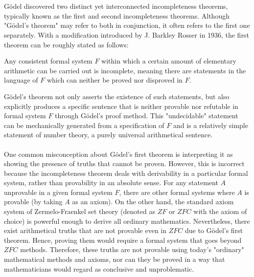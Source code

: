 \documentclass[10pt,a4paper]{article}
\newcounter{theo}
\begin{document}
                            \\
                            \\
                            Gödel discovered two distinct yet interconnected incompleteness theorems, typically known as the first and second incompleteness theorems. Although "Gödel's theorem" may refer to both in conjunction, it often refers to the first one separately. With a modification introduced by J. Barkley Rosser in 1936, the first theorem can be roughly stated as follows:
                            \begin{qt}
                                Any consistent formal system $F$ within which a certain amount of elementary arithmetic can be carried out is incomplete, meaning there are statements in the language of $F$ which can neither be proved nor disproved in $F$.
                            \end{qt}
                            Gödel's theorem not only asserts the existence of such statements, but also explicitly produces a specific sentence that is neither provable nor refutable in formal system $F$ through Gödel's proof method. This "undecidable" statement can be mechanically generated from a specification of $F$ and is a relatively simple statement of number theory, a purely universal arithmetical sentence.
                            \\
                            \\
                            One common misconception about Gödel's first theorem is interpreting it as showing the presence of truths that cannot be proven. However, this is incorrect because the incompleteness theorem deals with derivability in a particular formal system, rather than provability in an absolute sense. For any statement $A$ unprovable in a given formal system $F$, there are other formal systems where $A$ is provable (by taking $A$ as an axiom). On the other hand, the standard axiom system of Zermelo-Fraenkel set theory (denoted as $ZF$ or $ZFC$ with the axiom of choice) is powerful enough to derive all ordinary mathematics. Nevertheless, there exist arithmetical truths that are not provable even in $ZFC$ due to Gödel's first theorem. Hence, proving them would require a formal system that goes beyond $ZFC$ methods. Therefore, these truths are not provable using today's "ordinary" mathematical methods and axioms, nor can they be proved in a way that mathematicians would regard as conclusive and unproblematic.
                            \\
\end{document}
